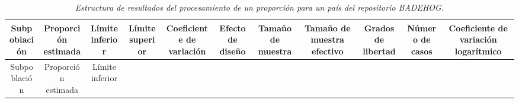 \documentclass[12pt,spanish,]{book}
\begin{document}
\begin{longtable}[]{@{}ccccccccccc@{}}
\caption{\emph{Estructura de resultados del procesamiento de un proporción para un país del repositorio BADEHOG.}
\label{T2}}\tabularnewline
\toprule
\begin{minipage}[b]{0.09\columnwidth}\centering
Subpoblación\strut
\end{minipage} & \begin{minipage}[b]{0.07\columnwidth}\centering
Proporción estimada\strut
\end{minipage} & \begin{minipage}[b]{0.04\columnwidth}\centering
Límite inferior\strut
\end{minipage} & \begin{minipage}[b]{0.04\columnwidth}\centering
Límite superior\strut
\end{minipage} & \begin{minipage}[b]{0.07\columnwidth}\centering
Coeficiente de variación\strut
\end{minipage} & \begin{minipage}[b]{0.05\columnwidth}\centering
Efecto de diseño\strut
\end{minipage} & \begin{minipage}[b]{0.05\columnwidth}\centering
Tamaño de muestra\strut
\end{minipage} & \begin{minipage}[b]{0.11\columnwidth}\centering
Tamaño de muestra efectivo\strut
\end{minipage} & \begin{minipage}[b]{0.05\columnwidth}\centering
Grados de libertad\strut
\end{minipage} & \begin{minipage}[b]{0.04\columnwidth}\centering
Número de casos\strut
\end{minipage} & \begin{minipage}[b]{0.11\columnwidth}\centering
Coeficiente de variación logarítmico\strut
\end{minipage}\tabularnewline
\midrule
\endfirsthead
\toprule
\begin{minipage}[b]{0.09\columnwidth}\centering
Subpoblación\strut
\end{minipage} & \begin{minipage}[b]{0.07\columnwidth}\centering
Proporción estimada\strut
\end{minipage} & \begin{minipage}[b]{0.04\columnwidth}\centering
Límite inferior\strut

\end{minipage}
\end{longtable}
\end{document}
